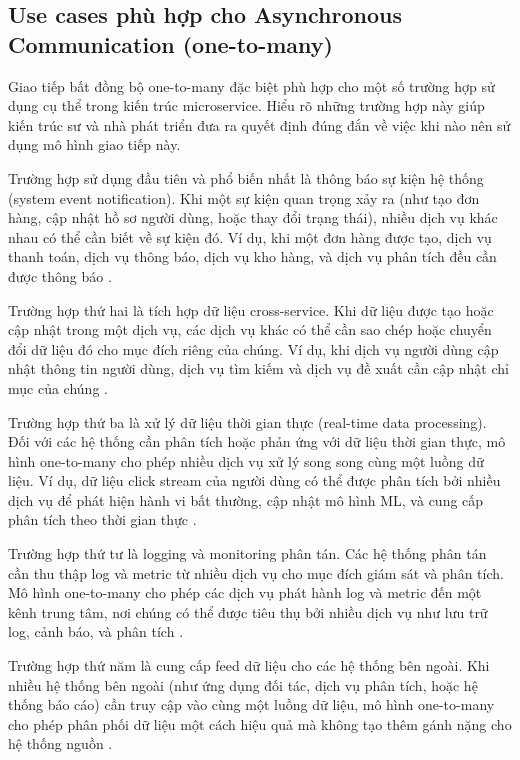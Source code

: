 \subsection{Use cases phù hợp cho Asynchronous Communication (one-to-many)}
Giao tiếp bất đồng bộ one-to-many đặc biệt phù hợp cho một số trường hợp sử dụng cụ thể trong kiến trúc microservice. Hiểu rõ những trường hợp này giúp kiến trúc sư và nhà phát triển đưa ra quyết định đúng đắn về việc khi nào nên sử dụng mô hình giao tiếp này.

Trường hợp sử dụng đầu tiên và phổ biến nhất là thông báo sự kiện hệ thống (system event notification). Khi một sự kiện quan trọng xảy ra (như tạo đơn hàng, cập nhật hồ sơ người dùng, hoặc thay đổi trạng thái), nhiều dịch vụ khác nhau có thể cần biết về sự kiện đó. Ví dụ, khi một đơn hàng được tạo, dịch vụ thanh toán, dịch vụ thông báo, dịch vụ kho hàng, và dịch vụ phân tích đều cần được thông báo \cite{newman2015}.

Trường hợp thứ hai là tích hợp dữ liệu cross-service. Khi dữ liệu được tạo hoặc cập nhật trong một dịch vụ, các dịch vụ khác có thể cần sao chép hoặc chuyển đổi dữ liệu đó cho mục đích riêng của chúng. Ví dụ, khi dịch vụ người dùng cập nhật thông tin người dùng, dịch vụ tìm kiếm và dịch vụ đề xuất cần cập nhật chỉ mục của chúng \cite{richardson2019}.

Trường hợp thứ ba là xử lý dữ liệu thời gian thực (real-time data processing). Đối với các hệ thống cần phân tích hoặc phản ứng với dữ liệu thời gian thực, mô hình one-to-many cho phép nhiều dịch vụ xử lý song song cùng một luồng dữ liệu. Ví dụ, dữ liệu click stream của người dùng có thể được phân tích bởi nhiều dịch vụ để phát hiện hành vi bất thường, cập nhật mô hình ML, và cung cấp phân tích theo thời gian thực \cite{goodhope2012}.

Trường hợp thứ tư là logging và monitoring phân tán. Các hệ thống phân tán cần thu thập log và metric từ nhiều dịch vụ cho mục đích giám sát và phân tích. Mô hình one-to-many cho phép các dịch vụ phát hành log và metric đến một kênh trung tâm, nơi chúng có thể được tiêu thụ bởi nhiều dịch vụ như lưu trữ log, cảnh báo, và phân tích \cite{aksakalli2021}.

Trường hợp thứ năm là cung cấp feed dữ liệu cho các hệ thống bên ngoài. Khi nhiều hệ thống bên ngoài (như ứng dụng đối tác, dịch vụ phân tích, hoặc hệ thống báo cáo) cần truy cập vào cùng một luồng dữ liệu, mô hình one-to-many cho phép phân phối dữ liệu một cách hiệu quả mà không tạo thêm gánh nặng cho hệ thống nguồn \cite{beyer2018}.

